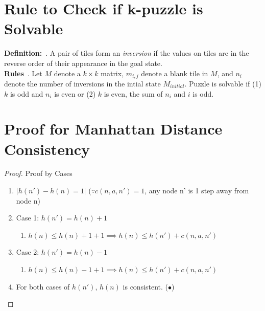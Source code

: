 \documentclass[runningheads]{llncs}
\begin{document}
\section{Rule to Check if k-puzzle is Solvable}
\textbf{Definition:}~\cite{princeton_computer_science_8-puzzle_nodate}. A pair of tiles form an \textit{inversion} if the values on tiles are in the reverse order of their appearance in the goal state. \\
\textbf{Rules}~\cite{princeton_computer_science_8-puzzle_nodate}. Let \( M \) denote a \( k \times k \) matrix, \( m_{i, j} \) denote a blank tile in \( M \), and \( n_i \) denote the number of inversions in the intial state \( M_{initial} \). Puzzle is solvable if (1) \( k \) is odd and \( n_i \) is even or (2) \( k \) is even, the sum of \(n_i \) and \( i \) is odd.


\appendix
\section{Proof for Manhattan Distance Consistency}
\label{appendix:manhat_cons}
\begin{proof} Proof by Cases
    \begin{enumerate}
        \item \( |h(n') - h(n) = 1| \) (\( \because c(n, a, n') = 1 \), any node n' is 1 step away from node n)
        \item Case 1: \( h(n') = h(n) + 1 \)
        \begin{enumerate}
            \item \( h(n) \leq h(n) + 1 + 1 \implies h(n) \leq h(n') + c(n, a, n') \)
        \end{enumerate}
        \item Case 2: \( h(n') = h(n) - 1 \)
        \begin{enumerate}
            \item \( h(n) \leq h(n) - 1 + 1 \implies h(n) \leq h(n') + c(n, a, n') \)
        \end{enumerate}
        \item For both cases of \( h(n') \), \( h(n) \) is consistent. (\(\bullet\))
    \end{enumerate}
\end{proof}

\end{document}
